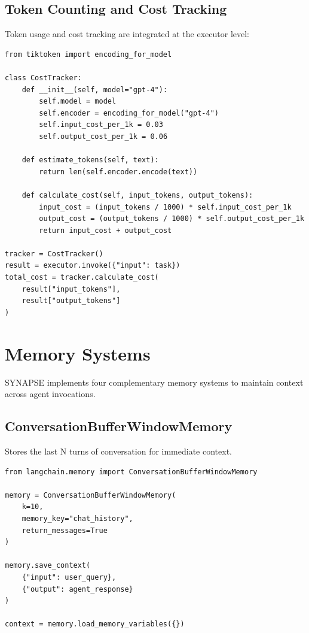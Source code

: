 \documentclass{report}
\begin{document}
\section{Token Counting and Cost Tracking}

Token usage and cost tracking are integrated at the executor level:

\begin{lstlisting}
from tiktoken import encoding_for_model

class CostTracker:
    def __init__(self, model="gpt-4"):
        self.model = model
        self.encoder = encoding_for_model("gpt-4")
        self.input_cost_per_1k = 0.03
        self.output_cost_per_1k = 0.06
    
    def estimate_tokens(self, text):
        return len(self.encoder.encode(text))
    
    def calculate_cost(self, input_tokens, output_tokens):
        input_cost = (input_tokens / 1000) * self.input_cost_per_1k
        output_cost = (output_tokens / 1000) * self.output_cost_per_1k
        return input_cost + output_cost

tracker = CostTracker()
result = executor.invoke({"input": task})
total_cost = tracker.calculate_cost(
    result["input_tokens"],
    result["output_tokens"]
)
\end{lstlisting}

\chapter{Memory Systems}

SYNAPSE implements four complementary memory systems to maintain context across agent invocations.

\section{ConversationBufferWindowMemory}

Stores the last N turns of conversation for immediate context.

\begin{lstlisting}
from langchain.memory import ConversationBufferWindowMemory

memory = ConversationBufferWindowMemory(
    k=10,
    memory_key="chat_history",
    return_messages=True
)

memory.save_context(
    {"input": user_query},
    {"output": agent_response}
)

context = memory.load_memory_variables({})
\end{lstlisting}
\end{document}

